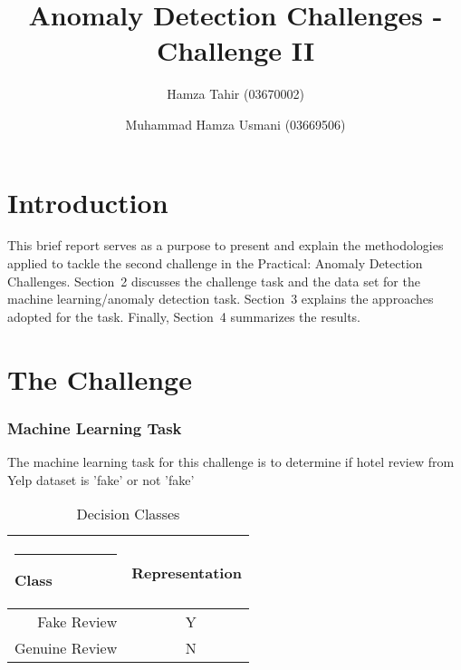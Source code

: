 \documentclass{llncs}
\begin{document}
%
\frontmatter          %
%
\pagestyle{headings}  %

\mainmatter              %
%
\title{Anomaly Detection Challenges - Challenge II}
%

%
\author{Hamza Tahir (03670002) \and Muhammad Hamza Usmani (03669506)}
%
%

\maketitle              %


%
\section{Introduction}
%
This brief report serves as a purpose to present and explain the methodologies applied to tackle the second challenge in the Practical: Anomaly Detection Challenges. Section~2 discusses the challenge task and the data set for the machine learning/anomaly detection task. Section~3 explains the approaches adopted for the task. Finally, Section~4 summarizes the results.
%
\section{The Challenge}
%
%
\subsubsection{Machine Learning Task}
%
The machine learning task for this challenge is to determine if hotel review from Yelp dataset is 'fake' or not 'fake'
\begin{table}
\caption{Decision Classes}
\begin{center}
\begin{tabular}{r@{\quad}rl}
\hline
\multicolumn{1}{l}{\rule{2pt}{0pt}
Class}&\multicolumn{2}{l}{Representation}\\[2pt]
\hline\rule{0pt}{12pt}
Fake Review&    Y& \\
Genuine Review&     N& \\[2pt]
\hline
\end{tabular}
\end{center}
\end{table}
%
\end{document}
